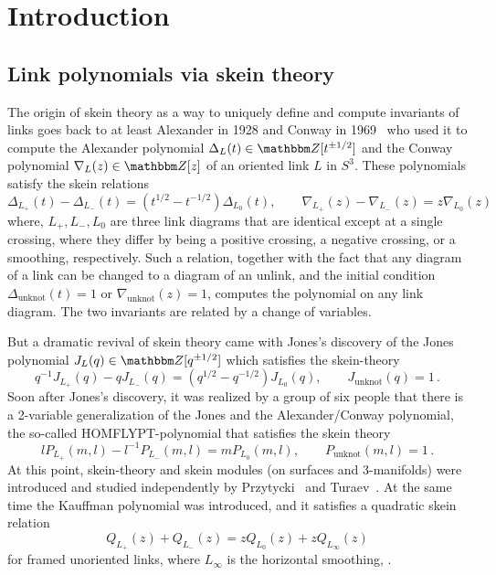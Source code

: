 \documentclass[12pt,reqno]{amsart}
\theoremstyle{definition}
\def\BZ{\mathbbm Z}
\def\be{\begin{equation}}
\def\ee{\end{equation}}
\begin{document}
\maketitle

{\footnotesize
\tableofcontents
}


\section{Introduction}
\label{sec.intro}

\subsection{Link polynomials via skein theory}

The origin of skein theory as a way to uniquely define and compute invariants of
links goes back to at least Alexander in 1928 and Conway in
1969~\cite{Alexander,Conway} who used it to compute the Alexander polynomial $\Delta_L(t) \in \BZ[t^{\pm 1/2}]$ and the Conway polynomial $\nabla_L(z) \in \BZ[z]$
of an oriented link $L$ in $S^3$. These polynomials satisfy the skein relations
\be
\Delta_{L_+}(t) - \Delta_{L_-}(t) = (t^{1/2}-t^{-1/2})\Delta_{L_0}(t),
\qquad
\nabla_{L_+}(z) - \nabla_{L_-}(z) = z \nabla_{L_0}(z)
\ee
where, \( L_+, L_-, L_0 \) are three link diagrams that are identical except at a
single crossing, where they differ by being a positive crossing, a negative crossing,
or a smoothing, respectively. Such a relation, together with the fact that any
diagram of a link can be changed to a diagram of an unlink, and the initial condition
$\Delta_{\text{unknot}}(t)=1$ or $\nabla_{\text{unknot}}(z)=1$, computes
the polynomial on any link diagram. The two invariants are related by a change of
variables. 

But a dramatic revival of skein theory came with Jones's discovery of the Jones
polynomial $J_L(q) \in \BZ[q^{\pm 1/2}]$ which satisfies the skein-theory
\be
q^{-1} J_{L_+}(q) - q J_{L_-}(q) = (q^{1/2} - q^{-1/2}) J_{L_0}(q), \qquad
J_{\text{unknot}}(q)=1 \,.
\ee
Soon after Jones's discovery, it was realized by a group of six people that there
is a 2-variable generalization of the Jones and the Alexander/Conway polynomial,
the so-called HOMFLYPT-polynomial that satisfies the skein theory~\cite{HOMFLY, PT}
\be
l P_{L_+}(m,l) - l^{-1} P_{L_-}(m,l) = m P_{L_0}(m,l), \qquad
P_{\text{unknot}}(m,l) = 1 \,.
\ee
At this point, skein-theory and skein modules (on surfaces and 3-manifolds) were
introduced and studied independently by Przytycki~\cite{PT,PT:conway} and
Turaev~\cite{Turaev:skein}. At the same time the Kauffman polynomial was introduced, and it satisfies a quadratic skein relation 
\be
Q_{L_+}(z)+Q_{L_-}(z)=zQ_{L_0}(z)+zQ_{L_\infty}(z)
\ee
for framed unoriented links, where $L_\infty$ is the horizontal smoothing,
\cite{Kauff2}.
\end{document}
